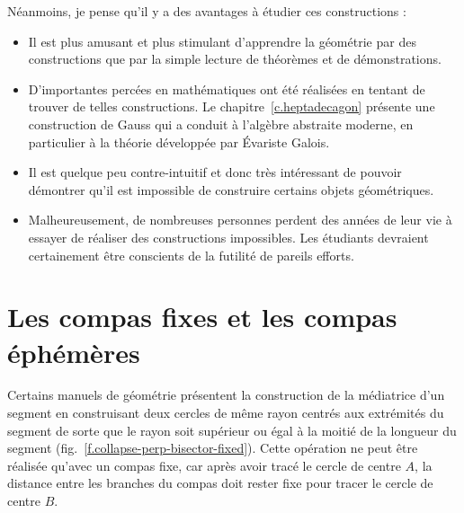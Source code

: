 Néanmoins, je pense qu'il y a des avantages à étudier ces constructions :
\begin{itemize}
\item Il est plus amusant et plus stimulant d'apprendre la géométrie par des constructions que par la simple lecture de théorèmes et de démonstrations.
\item D'importantes percées en mathématiques ont été réalisées en tentant de trouver de telles constructions. Le chapitre~\ref{c.heptadecagon} présente une construction de Gauss qui a conduit à l'algèbre abstraite moderne, en particulier à la théorie développée par \'Evariste Galois.
\item Il est quelque peu contre-intuitif et donc très intéressant de pouvoir démontrer qu'il est impossible de construire certains objets géométriques.
\item Malheureusement, de nombreuses personnes perdent des années de leur vie à essayer de réaliser des constructions impossibles. Les étudiants devraient certainement être conscients de la futilité de pareils efforts.
\end{itemize}

\section{Les compas fixes et les compas éphémères}\label{s.collapse}

Certains manuels de géométrie présentent la construction de la médiatrice  d'un segment  en construisant deux cercles de même rayon centrés aux extrémités du segment de sorte que le rayon soit supérieur ou égal   à la moitié de la longueur du segment (fig.~\ref{f.collapse-perp-bisector-fixed}). Cette opération ne peut être réalisée qu'avec un compas fixe, car après avoir tracé le cercle de centre  $A$, la distance entre les branches du compas doit rester fixe pour tracer le cercle de centre $B$.


\vspace{0.4cm}

